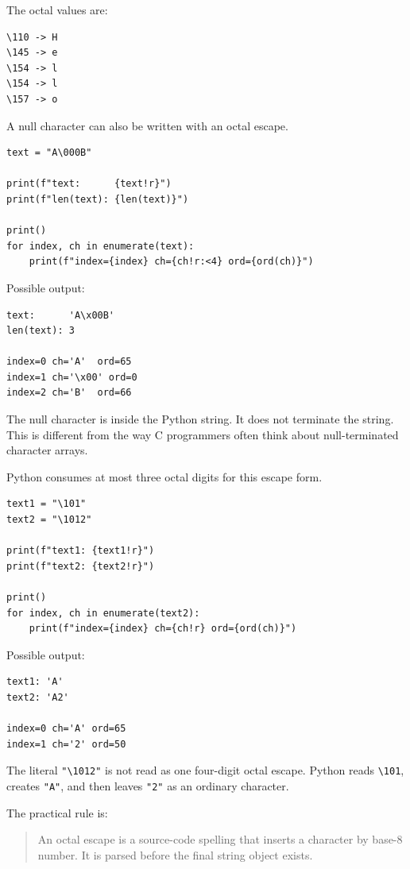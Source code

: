 The octal values are:

\begin{verbatim}
\110 -> H
\145 -> e
\154 -> l
\154 -> l
\157 -> o
\end{verbatim}

A null character can also be written with an octal escape.

\begin{verbatim}
text = "A\000B"

print(f"text:      {text!r}")
print(f"len(text): {len(text)}")

print()
for index, ch in enumerate(text):
    print(f"index={index} ch={ch!r:<4} ord={ord(ch)}")
\end{verbatim}

Possible output:

\begin{verbatim}
text:      'A\x00B'
len(text): 3

index=0 ch='A'  ord=65
index=1 ch='\x00' ord=0
index=2 ch='B'  ord=66
\end{verbatim}

The null character is inside the Python string. It does not terminate the string. This is different from the way C programmers often think about null-terminated character arrays.

Python consumes at most three octal digits for this escape form.

\begin{verbatim}
text1 = "\101"
text2 = "\1012"

print(f"text1: {text1!r}")
print(f"text2: {text2!r}")

print()
for index, ch in enumerate(text2):
    print(f"index={index} ch={ch!r} ord={ord(ch)}")
\end{verbatim}

Possible output:

\begin{verbatim}
text1: 'A'
text2: 'A2'

index=0 ch='A' ord=65
index=1 ch='2' ord=50
\end{verbatim}

The literal \texttt{"\textbackslash 1012"} is not read as one four-digit octal escape. Python reads \texttt{\textbackslash 101}, creates \texttt{"A"}, and then leaves \texttt{"2"} as an ordinary character.

The practical rule is:

\begin{quote}
An octal escape is a source-code spelling that inserts a character by base-8 number. It is parsed before the final string object exists.
\end{quote}

